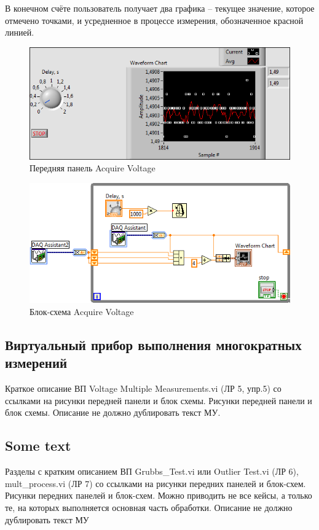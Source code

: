 \documentclass[a4paper,14pt]{article}
\begin{document}
В конечном счёте пользователь получает два графика -- текущее значение, которое отмечено точками, и усредненное в процессе измерения, обозначенное красной линией.

\begin{figure}[H]
	\centering		
	\includegraphics[width=\linewidth]{image/av_vi}
	\caption{Передняя панель Acquire Voltage}\label{img:av_vi}
\end{figure}


\begin{figure}[H]
	\centering		
	\includegraphics[width=\linewidth]{image/av_schema}
	\caption{Блок-схема Acquire Voltage}\label{img:av_schema}
\end{figure}

\subsection{Виртуальный прибор выполнения многократных измерений }

Краткое описание ВП Voltage Multiple Measurements.vi (ЛР 5, упр.5) со ссылками на рисунки передней панели и блок схемы. Рисунки передней панели и блок схемы. Описание не должно дублировать текст МУ.

\subsection{Some text}
Разделы с кратким описанием ВП Grubbs\_Test.vi или Outlier Test.vi (ЛР 6), mult\_process.vi (ЛР 7) со ссылками на рисунки передних панелей и блок-схем. Рисунки передних панелей и блок-схем. Можно приводить не все кейсы, а только те, на которых выполняется основная часть обработки. Описание не должно дублировать текст МУ 
\end{document}
